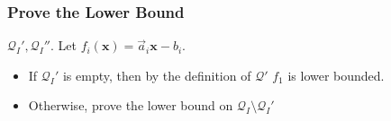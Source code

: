 \documentclass[11pt]{beamer}
\begin{document}
\begin{frame}\frametitle{Prove the Lower Bound}
$\mathcal{Q}_I', \mathcal{Q}_I''$. Let $f_i(\textbf{x}) = \vec{a}_i\textbf{x} - b_i$.
\begin{itemize}
\item If $\mathcal{Q}_I'$ is empty, then by the definition of $\mathcal{Q}'$ $f_1$ is lower bounded.

\item Otherwise, prove the lower bound on $\mathcal{Q}_I \setminus \mathcal{Q}_I'$
\end{itemize}


\end{frame}



\begin{frame}

\end{frame}
\end{document}
